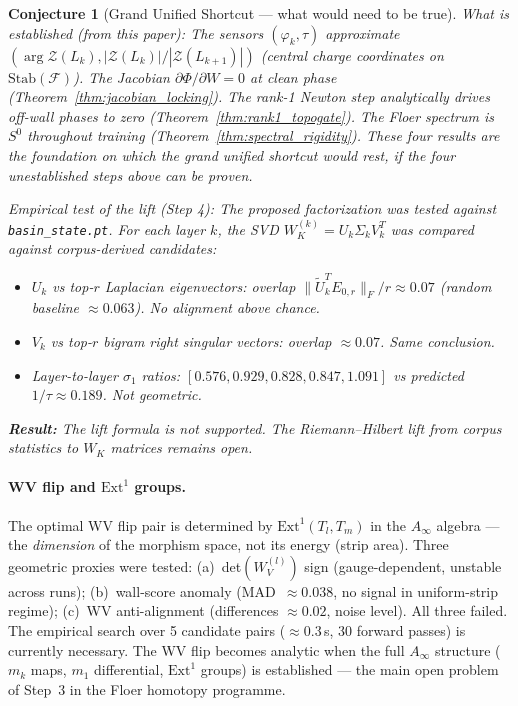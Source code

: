 \documentclass[11pt]{amsart}
\newtheorem{conjecture}[theorem]{Conjecture}
\begin{document}
\begin{conjecture}[Grand Unified Shortcut --- what would need to be true]
\emph{What is established (from this paper):}
The sensors $(\varphi_k, \tau)$ approximate $(\arg\mathcal{Z}(L_k), |\mathcal{Z}(L_k)|/|\mathcal{Z}(L_{k+1})|)$
(central charge coordinates on $\mathrm{Stab}(\mathcal{F})$).
The Jacobian $\partial\Phi/\partial W = 0$ at clean phase (Theorem~\ref{thm:jacobian_locking}).
The rank-1 Newton step analytically drives off-wall phases to zero (Theorem~\ref{thm:rank1_topogate}).
The Floer spectrum is $S^0$ throughout training (Theorem~\ref{thm:spectral_rigidity}).
These four results are the foundation on which the grand unified shortcut would rest,
if the four unestablished steps above can be proven.

\emph{Empirical test of the lift (Step 4):}
The proposed factorization was tested against \texttt{basin\_state.pt}.
For each layer $k$, the SVD $W_K^{(k)} = U_k \Sigma_k V_k^T$ was compared against
corpus-derived candidates:
\begin{itemize}
\item $U_k$ vs top-$r$ Laplacian eigenvectors:
  overlap $\|\tilde{U}_k^T E_{0,r}\|_F/r \approx 0.07$
  (random baseline $\approx 0.063$). \emph{No alignment above chance.}
\item $V_k$ vs top-$r$ bigram right singular vectors:
  overlap $\approx 0.07$. \emph{Same conclusion.}
\item Layer-to-layer $\sigma_1$ ratios:
  $[0.576, 0.929, 0.828, 0.847, 1.091]$
  vs predicted $1/\tau \approx 0.189$. \emph{Not geometric.}
\end{itemize}
\textbf{Result:} The lift formula is not supported.
The Riemann--Hilbert lift from corpus statistics to $W_K$ matrices remains open.
\end{conjecture}

\paragraph{WV flip and $\mathrm{Ext}^1$ groups.}
The optimal WV flip pair is determined by $\mathrm{Ext}^1(T_l, T_m)$
in the $A_\infty$ algebra --- the \emph{dimension} of the morphism space,
not its energy (strip area).
Three geometric proxies were tested: (a)~det$(W_V^{(l)})$ sign
(gauge-dependent, unstable across runs); (b)~wall-score anomaly
(MAD~$\approx 0.038$, no signal in uniform-strip regime);
(c)~WV anti-alignment (differences $\approx 0.02$, noise level).
All three failed. The empirical search over 5 candidate pairs
($\approx 0.3$\,s, 30 forward passes) is currently necessary.
The WV flip becomes analytic when the full $A_\infty$ structure
($m_k$ maps, $m_1$ differential, $\mathrm{Ext}^1$ groups) is
established --- the main open problem of Step~3 in the Floer
homotopy programme.
\end{document}
